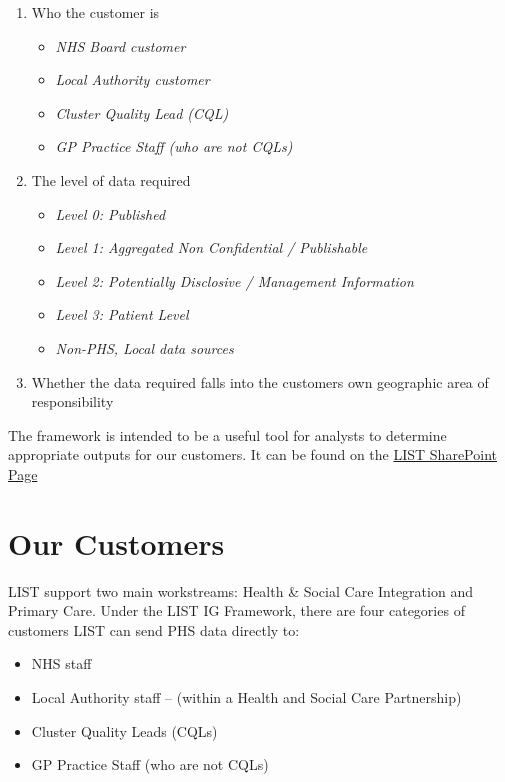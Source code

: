 \documentclass[
]{book}
\begin{document}
\begin{enumerate}
\def\labelenumi{\arabic{enumi}.}
\item
  Who the customer is

  \begin{itemize}
  \item
    \emph{NHS Board customer}
  \item
    \emph{Local Authority customer}
  \item
    \emph{Cluster Quality Lead (CQL)}
  \item
    \emph{GP Practice Staff (who are not CQLs)}
  \end{itemize}
\item
  The level of data required

  \begin{itemize}
  \item
    \emph{Level 0: Published}
  \item
    \emph{Level 1: Aggregated Non Confidential / Publishable}
  \item
    \emph{Level 2: Potentially Disclosive / Management Information}
  \item
    \emph{Level 3: Patient Level}
  \item
    \emph{Non-PHS, Local data sources}
  \end{itemize}
\item
  Whether the data required falls into the customers own geographic area of responsibility
\end{enumerate}

The framework is intended to be a useful tool for analysts to determine appropriate outputs for our customers. It can be found on the \href{https://scottish.sharepoint.com/:x:/r/sites/PHS-LIST/_layouts/15/Doc.aspx?sourcedoc=\%7B4675F488-0BED-48E2-967F-4D006D7BA596\%7D\&file=LIST\%20IG\%20Approvals\%20Framework.xlsx\&action=default\&mobileredirect=true}{LIST SharePoint Page}

\hypertarget{our-customers}{%
\section{Our Customers}\label{our-customers}}

LIST support two main workstreams: Health \& Social Care Integration and Primary Care. Under the LIST IG Framework, there are four categories of customers LIST can send PHS data directly to:

\begin{itemize}
\item
  NHS staff
\item
  Local Authority staff -- (within a Health and Social Care Partnership)
\item
  Cluster Quality Leads (CQLs)
\item
  GP Practice Staff (who are not CQLs)
\end{itemize}
\end{document}
